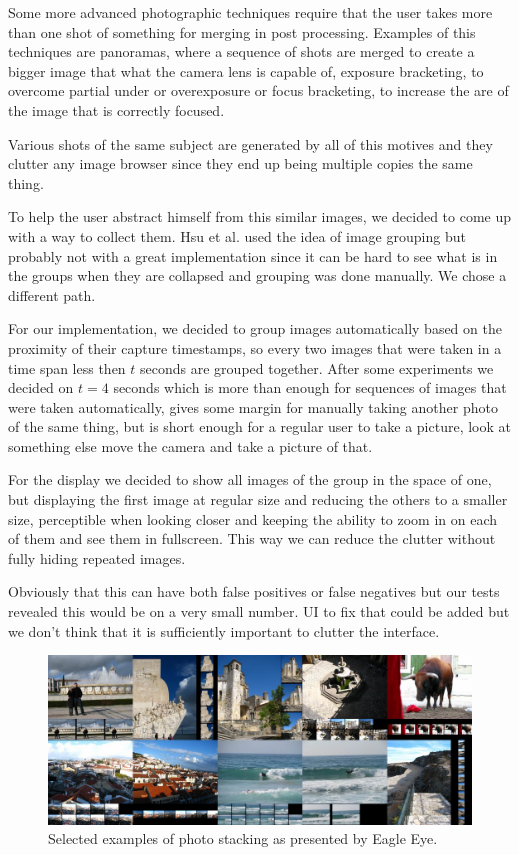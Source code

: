Some more advanced photographic techniques require that the user takes more than one shot of something for merging in post processing. Examples of this techniques are panoramas, where a sequence of shots are merged to create a bigger image that what the camera lens is capable of, exposure bracketing, to overcome partial under or overexposure or focus bracketing, to increase the are of the image that is correctly focused.

Various shots of the same subject are generated by all of this motives and they clutter any image browser since they end up being multiple copies the same thing.

To help the user abstract himself from this similar images, we decided to come up with a way to collect them. Hsu et al. \cite{Hsu:2009p2696} used the idea of image grouping but probably not with a great implementation since it can be hard to see what is in the groups when they are collapsed and grouping was done manually. We chose a different path.

For our implementation, we decided to group images automatically based on the proximity of their capture timestamps, so every two images that were taken in a time span less then $t$ seconds are grouped together. After some experiments we decided on $t=4$ seconds which is more than enough for sequences of images that were taken automatically, gives some margin for manually taking another photo of the same thing, but is short enough for a regular user to take a picture, look at something else move the camera and take a picture of that.

For the display we decided to show all images of the group in the space of one, but displaying the first image at regular size and reducing the others to a smaller size, perceptible when looking closer and keeping the ability to zoom in on each of them and see them in fullscreen. This way we can reduce the clutter without fully hiding repeated images.

Obviously that this can have both false positives or false negatives but our tests revealed this would be on a very small number. \ac{UI} to fix that could be added but we don't think that it is sufficiently important to clutter the interface.

\begin{figure}[htbp]
	\centering
		\includegraphics[width=\linewidth]{Figures/stacks-motives.png}
	\vspace{-10px}
	\caption{Selected examples of photo stacking as presented by Eagle Eye.}
	\label{fig:stacks1}
	\vspace{-5px}
\end{figure}


